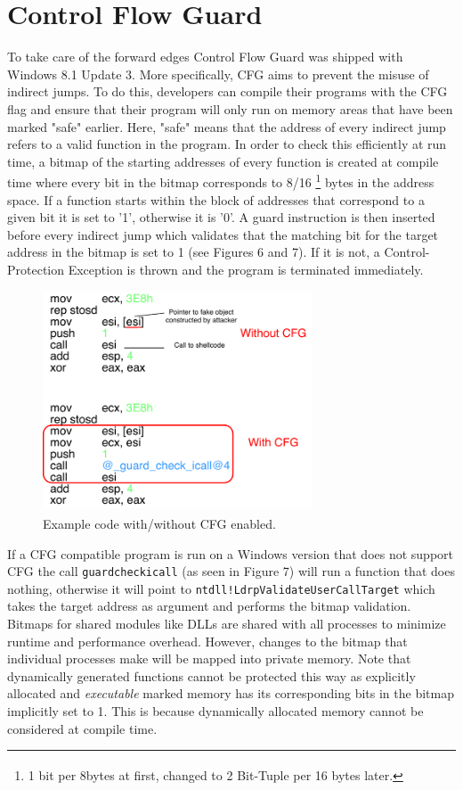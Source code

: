 \documentclass[10pt,twocolumn,a4paper]{article}
\begin{document}
\section{Control Flow Guard}\label{CFG}
To take care of the forward edges Control Flow Guard was shipped with Windows 8.1 Update 3\cite{cfgexplore}.
More specifically, CFG aims to prevent the misuse of indirect jumps.
To do this, developers can compile their programs with the CFG flag and ensure that their program will only run on memory areas that have been marked "safe" earlier\cite{CFG2}.
Here, "safe" means that the address of every indirect jump refers to a valid function in the program.
In order to check this efficiently at run time, a bitmap of the starting addresses of every function is created at compile time where every bit in the bitmap corresponds to 8/16 \footnote{1 bit per 8bytes at first, changed to 2 Bit-Tuple per 16 bytes later\textsuperscript{\cite{tuple}}.} bytes in the address space\cite{cfgexplore}.
If a function starts within the block of addresses that correspond to a given bit it is set to '1', otherwise it is '0'.
A guard instruction is then inserted before every indirect jump which validates that the matching bit for the target address in the bitmap is set to 1 (see Figures 6 and 7)\cite{cfgexplore}. If it is not, a Control-Protection Exception is thrown and the program is terminated immediately\cite{SS}.
\begin{figure}[htbp]
	\includegraphics[keepaspectratio,width=8cm]{fig/cfg}
	\caption{Example code with/without CFG enabled\textsuperscript{\cite{cfgexplore}}.}
\end{figure}
If a CFG compatible program is run on a Windows version that does not support CFG the call \texttt{\textunderscore guard\textunderscore check\textunderscore icall} (as seen in Figure 7) will run a function that does nothing, otherwise it will point to \texttt{ntdll!LdrpValidateUserCallTarget} which takes the target address as argument and performs the bitmap validation\cite{cfgexplore}.
Bitmaps for shared modules like DLLs are shared with all processes to minimize runtime and performance overhead. However, changes to the bitmap that individual processes make will be mapped into private memory\cite{cfginternals}.
Note that dynamically generated functions cannot be protected this way as explicitly allocated and \emph{executable} marked memory has its corresponding bits in the bitmap implicitly set to 1\cite{cfgexplore}.
This is because dynamically allocated memory cannot be considered at compile time.
\end{document}
